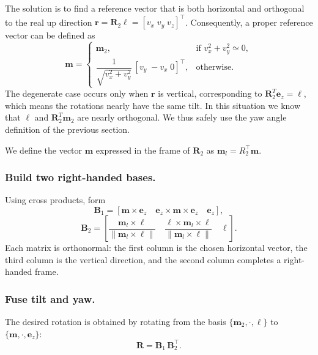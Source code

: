 \documentclass{IJCAS}
\begin{document}
The solution is to find a reference vector that is both horizontal and orthogonal to the real up direction $\boldsymbol{r}=\boldsymbol{R}_{2}\boldsymbol{\ell}=[v_{x}\;v_{y}\;v_{z}]^{\top}$.
Consequently, a proper reference vector can be defined as
\[
  \boldsymbol{m}
  =
  \begin{cases}
    \boldsymbol{m}_2, &
      \text{if } v_{x}^{2}+v_{y}^{2}\simeq0,\\[6pt]
    \dfrac{1}{\sqrt{v_{x}^{2}+v_{y}^{2}}}\,[v_{y}\;-v_{x}\;0]^{\top},
    & \text{otherwise.}
  \end{cases}
\]
The degenerate case occurs only when $\boldsymbol{r}$ is vertical, corresponding to $\boldsymbol{R}_{2}^{T}\boldsymbol{e}_{z} = \boldsymbol{\ell}$, which means the rotations nearly have the same tilt. In this situation we know that $\boldsymbol{\ell}$ and $\boldsymbol{R}_{2}^T\boldsymbol{m}_2$ are nearly orthogonal. We thus safely use the yaw angle definition of the previous section.  

We define the vector $\boldsymbol{m}$ expressed in the frame of $\boldsymbol{R}_{2}$ as 
$\boldsymbol{m}_{l}=R_{2}^{\top}\boldsymbol{m}$.


\subsubsection{ Build two right-handed bases.}
Using cross products, form
\[
  \boldsymbol{B}_{1}
  =
  \left[
    \boldsymbol{m}\times\boldsymbol{e}_{z}\quad
    \boldsymbol{e}_{z}\times\boldsymbol{m}\times\boldsymbol{e}_{z}\quad
    \boldsymbol{e}_{z}
  \right],
\]
\[
  \boldsymbol{B}_{2}
  =
  \left[
    \frac{\boldsymbol{m}_{l}\times\boldsymbol{\ell}}
         {\|\boldsymbol{m}_{l}\times\boldsymbol{\ell}\|}\quad
    \frac{\boldsymbol{\ell}\times\boldsymbol{m}_{l}\times\boldsymbol{\ell}}
         {\|\boldsymbol{m}_{l}\times\boldsymbol{\ell}\|}\quad
    \boldsymbol{\ell}
  \right].
\]
Each matrix is orthonormal: the first column is the chosen horizontal
vector, the third column is the vertical direction, and the second
column completes a right-handed frame.

\subsubsection{ Fuse tilt and yaw.}
The desired rotation is obtained by rotating from the basis
$\{\boldsymbol{m}_{2},\cdot,\boldsymbol{\ell}\}$ to
$\{\boldsymbol{m},\cdot,\boldsymbol{e}_{z}\}$:
\begin{equation}
  \boldsymbol{R} = \boldsymbol{B}_{1}\,\boldsymbol{B}_{2}^{\top}.
  \label{eq:fused_R}
\end{equation}
\end{document}
